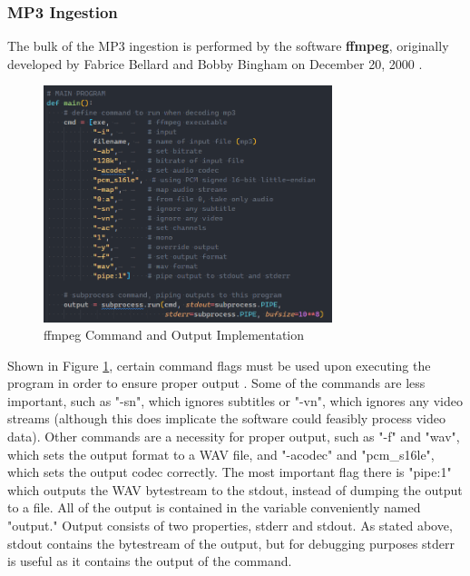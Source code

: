 \documentclass[UTF8, 12pt]{article}
\begin{document}
\subsubsection{MP3 Ingestion}
    The bulk of the MP3 ingestion is performed by the software \textbf{ffmpeg}, originally developed by Fabrice Bellard and Bobby Bingham on December 20, 2000 \cite{ffmpeg}. 
    \begin{figure}[h]
        \centering
        \includegraphics[width=0.75\textwidth]{ffmpeg_code}
        \caption{ffmpeg Command and Output Implementation}
        \label{ff_code}
    \end{figure}
    Shown in Figure \ref{ff_code}, certain command flags must be used upon executing the program in order to ensure proper output \cite{ffmpeg}. Some of the commands are less important, such as "-sn", which ignores subtitles or "-vn", which ignores any video streams (although this does implicate the software could feasibly process video data). Other commands are a necessity for proper output, such as "-f" and "wav", which sets the output format to a WAV file, and "-acodec" and "pcm\_s16le", which sets the output codec correctly. The most important flag there is "pipe:1" which outputs the WAV bytestream to the stdout, instead of dumping the output to a file. All of the output is contained in the variable conveniently named "output." Output consists of two properties, stderr and stdout. As stated above, stdout contains the bytestream of the output, but for debugging purposes stderr is useful as it contains the output of the command.
\end{document}

